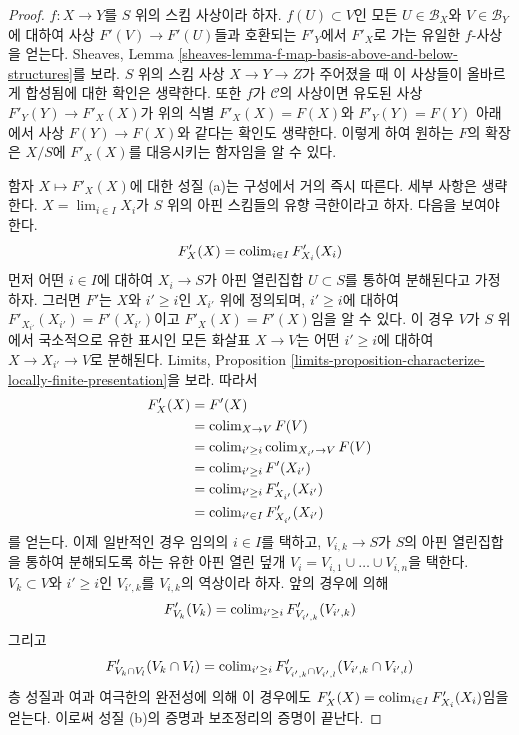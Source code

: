 \begin{proof}
\medskip\noindent
$f : X \to Y$를 $S$ 위의 스킴 사상이라 하자. $f(U) \subset V$인 모든
$U \in \mathcal{B}_X$와 $V \in \mathcal{B}_Y$에 대하여 사상
$F'(V) \to F'(U)$들과 호환되는 $F'_Y$에서 $F'_X$로 가는 유일한
$f$-사상을 얻는다. Sheaves, Lemma
\ref{sheaves-lemma-f-map-basis-above-and-below-structures}를 보라. $S$ 위의
스킴 사상 $X \to Y \to Z$가 주어졌을 때 이 사상들이 올바르게 합성됨에 대한
확인은 생략한다. 또한 $f$가 $\mathcal{C}$의 사상이면 유도된 사상
$F'_Y(Y) \to F'_X(X)$가 위의 식별 $F'_X(X) = F(X)$와
$F'_Y(Y) = F(Y)$ 아래에서 사상 $F(Y) \to F(X)$와 같다는 확인도 생략한다.
이렇게 하여 원하는 $F$의 확장은 $X/S$에 $F'_X(X)$를 대응시키는
함자임을 알 수 있다.

\medskip\noindent
함자 $X \mapsto F'_X(X)$에 대한 성질 (a)는 구성에서 거의 즉시 따른다.
세부 사항은 생략한다. $X = \lim_{i \in I} X_i$가 $S$ 위의 아핀 스킴들의
유향 극한이라고 하자. 다음을 보여야 한다.
$$
F'_X(X) = \mathop{\mathrm{colim}}\nolimits_{i \in I} F'_{X_i}(X_i)
$$
먼저 어떤 $i \in I$에 대하여 $X_i \to S$가 아핀 열린집합 $U \subset S$를
통하여 분해된다고 가정하자. 그러면 $F'$는 $X$와 $i' \geq i$인 $X_{i'}$
위에 정의되며, $i' \geq i$에 대하여
$F'_{X_{i'}}(X_{i'}) = F'(X_{i'})$이고 $F'_X(X) = F'(X)$임을 알 수 있다.
이 경우 $V$가 $S$ 위에서 국소적으로 유한 표시인 모든 화살표 $X \to V$는
어떤 $i' \geq i$에 대하여 $X \to X_{i'} \to V$로 분해된다. Limits,
Proposition \ref{limits-proposition-characterize-locally-finite-presentation}을
보라. 따라서
\begin{align*}
F'_X(X)
& =
F'(X)  \\
& = \mathop{\mathrm{colim}}\nolimits_{X \to V} F(V) \\
& =
\mathop{\mathrm{colim}}\nolimits_{i' \geq i} \mathop{\mathrm{colim}}\nolimits_{X_{i'} \to V} F(V) \\
& =
\mathop{\mathrm{colim}}\nolimits_{i' \geq i} F'(X_{i'}) \\
& =
\mathop{\mathrm{colim}}\nolimits_{i' \geq i} F'_{X_{i'}}(X_{i'}) \\
& =
\mathop{\mathrm{colim}}\nolimits_{i' \in I} F'_{X_{i'}}(X_{i'})
\end{align*}
를 얻는다. 이제 일반적인 경우 임의의 $i \in I$를 택하고,
$V_{i, k} \to S$가 $S$의 아핀 열린집합을 통하여 분해되도록 하는 유한
아핀 열린 덮개 $V_i = V_{i, 1} \cup \ldots \cup V_{i, n}$을 택한다.
$V_k \subset V$와 $i' \geq i$인 $V_{i', k}$를 $V_{i, k}$의 역상이라 하자.
앞의 경우에 의해
$$
F'_{V_k}(V_k) = \mathop{\mathrm{colim}}\nolimits_{i' \geq i} F'_{V_{i', k}}(V_{i', k})
$$
그리고
$$
F'_{V_k \cap V_l}(V_k \cap V_l) =
\mathop{\mathrm{colim}}\nolimits_{i' \geq i}
F'_{V_{i', k} \cap V_{i', l}}(V_{i', k} \cap V_{i', l})
$$
층 성질과 여과 여극한의 완전성에 의해 이 경우에도
$F'_X(X) = \mathop{\mathrm{colim}}\nolimits_{i \in I} F'_{X_i}(X_i)$임을 얻는다. 이로써 성질 (b)의
증명과 보조정리의 증명이 끝난다.
\end{proof}


